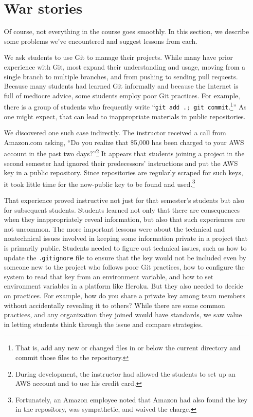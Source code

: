 \section{War stories}

Of course, not everything in the course goes smoothly.  In this section,
we describe some problems we've encountered and suggest lessons from each.

We ask students to use Git to manage their projects.  While many
have prior experience with Git, most expand
their understanding and usage, moving
from a single branch to multiple branches, and from pushing
to sending pull requests.  Because many students had learned Git
informally and because the Internet is full of mediocre advice,
some students employ poor Git practices.  For example, there is a
group of students who frequently write ``\texttt{git add .; git
commit}.\footnote{That is, add any new or changed files in or below
the current directory and commit those files to the repository.}''
As one might expect, that can lead to inappropriate materials in
public repositories.

We discovered one such case indirectly.  The instructor received
a call from Amazon.com asking, ``Do you realize that \$5,000 has
been charged to your AWS account in the past two days?''\footnote{During
development, the instructor had allowed the students to set up an
AWS account and to use his credit card.}  It appears that students
joining a project in the second semester had ignored their predecessors'
instructions and put the AWS key in a public repository.  Since
repositories are regularly scraped for such
keys, it took little time for the now-public key to be found and
used.\footnote{Fortunately, an Amazon employee noted that Amazon
had also found the key in the repository, was sympathetic, and
waived the charge.}

That experience proved instructive not just for that semester's
students but also for subsequent students.  Students learned not
only that there are consequences when they inappropriately reveal
information, but also that such experiences are not uncommon.  The
more important lessons were about the technical and nontechnical
issues involved in keeping some information private in a project
that is primarily public.  Students needed to figure out technical
issues, such as how to update the \texttt{.gitignore} file to ensure
that the key would not be included even by someone new to the
project who follows poor Git practices, how to configure the system to read
that key from an environment variable, and how to set environment
variables in a platform like Heroku.  But they also needed to decide
on practices.  For example, how do you share a private key among
team members without accidentally revealing it to others?  While
there are some common practices, and any organization they joined
would have standards, we saw value in letting students think through
the issue and compare strategies.

